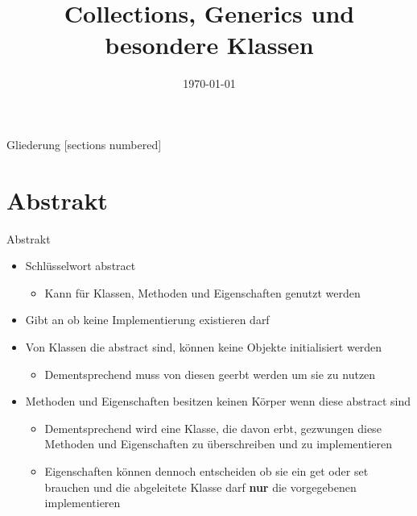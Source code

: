 



\title{Collections, Generics und besondere Klassen}
\date{\today}




\maketitle

\begin{frame}{Gliederung}
	[sections numbered]
	\tableofcontents
\end{frame}

\section{Abstrakt}
\begin{frame}{Abstrakt}
	\begin{itemize}
		\item Schlüsselwort \alert{abstract}
		\begin{itemize}
			\item Kann für Klassen, Methoden und Eigenschaften genutzt werden		
		\end{itemize}
		\item Gibt an ob keine Implementierung existieren darf
		\item Von Klassen die \alert{abstract} sind, können keine Objekte initialisiert werden
		\begin{itemize}
			\item Dementsprechend muss von diesen geerbt werden um sie zu nutzen
		\end{itemize}
		\item Methoden und Eigenschaften besitzen keinen Körper wenn diese \alert{abstract} sind
		\begin{itemize}
			\item Dementsprechend wird eine Klasse, die davon erbt, gezwungen diese Methoden und Eigenschaften zu überschreiben und zu implementieren
			\item Eigenschaften können dennoch entscheiden ob sie ein \alert{get} oder \alert{set} brauchen und die abgeleitete Klasse darf \textbf{nur} die vorgegebenen implementieren
		\end{itemize}
	\end{itemize}
\end{frame}

